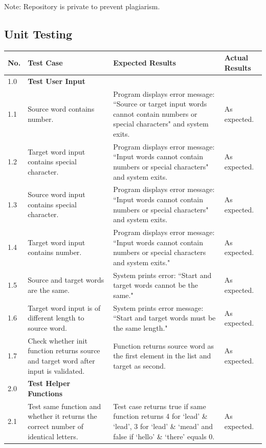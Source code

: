 \documentclass[12pt, a4]{report}
\begin{document}
		\par\vspace{1cm}\small Note: Repository is private to prevent plagiarism. 
	
	\subsection{Unit Testing}


		\begin{tabular}{ |p{0.5cm}|p{5cm}|p{5cm}|p{5cm}| }
			\hline
			No. & Test Case & Expected Results & Actual Results \\
			\hline
			1.0 & \textbf{Test User Input} &  & \\
			1.1 & Source word contains number. & Program displays error message: ``Source or target input words cannot contain numbers or special characters" and system exits. & As expected.\\
			1.2 & Target word input contains special character. & Program displays error message: ``Input words cannot contain numbers or special characters" and system exits. & As expected. \\
			1.3 & Source word input contains special character. & Program displays error message: ``Input words cannot contain numbers or special characters" and system exits. & As expected. \\
			1.4 & Target word input contains number. & Program displays error message: ``Input words cannot contain numbers or special characters and system exits." & As expected. \\
			1.5 & Source and target words are the same. & System prints error: ``Start and target words cannot be the same." & As expected. \\
			1.6 & Target word input is of different length to source word. & System prints error message: ``Start and target words must be the same length." & As expected. \\
			1.7 & Check whether init function returns source and target word after input is validated. & Function returns source word as the first element in the list and target as second. & As expected.\\
			2.0 & \textbf{Test Helper Functions} &  &  \\
			2.1 & Test same function and whether it returns the correct number of identical letters. & Test case returns true if same function returns 4 for `lead' \& `lead', 3 for `lead' \& `mead' and false if `hello' \& `there' equals 0. & As expected. \\
			\hline
		\end{tabular}
\end{document}

